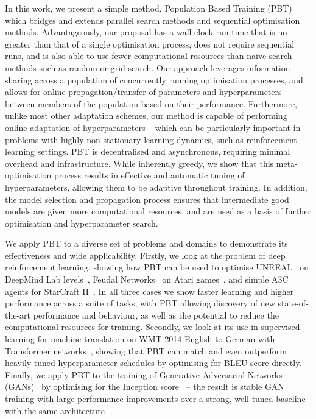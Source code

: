 \documentclass{article} %
\begin{document}
In this work, we present a simple method, Population Based Training (PBT) which bridges and extends parallel search methods and sequential optimisation methods.
%
Advantageously, our proposal has a wall-clock run time that is no greater than that of a single optimisation process, does not require sequential runs, and is also able to use fewer computational resources than naive search methods such as random or grid search.
%
Our approach leverages information sharing across a population of concurrently running optimisation processes, and allows for online propagation/transfer of parameters and hyperparameters between members of the population based on their performance. Furthermore, unlike most other adaptation schemes, our method is capable of performing online adaptation of hyperparameters -- which can be particularly important in problems with highly non-stationary learning dynamics, such as reinforcement learning settings.
%
PBT is decentralised and asynchronous, requiring minimal overhead and infrastructure. While inherently greedy, we show that this meta-optimisation process results in effective and automatic tuning of hyperparameters, allowing them to be adaptive throughout training. In addition, the model selection and propagation process ensures that intermediate good models are given more computational resources, and are used as a basis of further optimisation and hyperparameter search. 

We apply PBT to a diverse set of problems and domains to demonstrate its effectiveness and wide applicability. Firstly, we look at the problem of deep reinforcement learning, showing how PBT can be used to optimise UNREAL~\citep{jaderberg2016reinforcement} on DeepMind Lab levels~\citep{beattie2016deepmind}, Feudal Networks~\citep{vezhnevets2017feudal} on Atari games~\citep{bellemare2013arcade}, and simple A3C agents for StarCraft II~\citep{vinyals2017starcraft}. In all three cases we show faster learning and higher performance across a suite of tasks, with PBT allowing discovery of new state-of-the-art performance and behaviour, as well as the potential to reduce the computational resources for training. Secondly, we look at its use in supervised learning for machine translation on WMT 2014 English-to-German with Transformer networks~\citep{vaswani2017attention}, showing that PBT can match and even outperform heavily tuned hyperparameter schedules by optimising for BLEU score directly. Finally, we apply PBT to the training of Generative Adversarial Networks (GANs)~\citep{goodfellowgan} by optimising for the Inception score~\citep{openaigan} -- the result is stable GAN training with
large performance improvements over a strong, well-tuned baseline with the same architecture~\citep{dcgan}.
\end{document}
